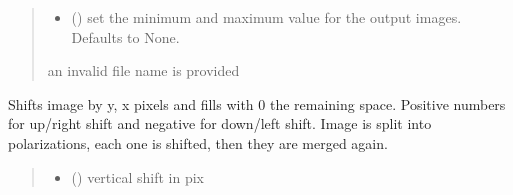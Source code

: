 \documentclass[letterpaper,10pt,english]{sphinxmanual}
\begin{document}
\begin{fulllineitems}
\begin{fulllineitems}
\begin{quote}
\begin{description}
\begin{itemize}
\item {} 
\sphinxAtStartPar
{} (\sphinxstyleliteralemphasis{\sphinxupquote{{[}}}\sphinxstyleliteralemphasis{\sphinxupquote{, }}\sphinxstyleliteralemphasis{\sphinxupquote{{]}}}\sphinxstyleliteralemphasis{\sphinxupquote{, }}) \textendash{} set the minimum and maximum value for the output images. Defaults to None.

\end{itemize}

\sphinxAtStartPar
{} \textendash{} an invalid file name is provided

\end{description}\end{quote}

\end{fulllineitems}


\begin{fulllineitems}
\label{\detokenize{micropolarray:micropolarray.micropol_image.MicropolImage.shift}}
\pysigstartsignatures
{}
\pysigstopsignatures
\sphinxAtStartPar
Shifts image by y, x pixels and fills with 0 the remaining space. Positive numbers for up/right shift and negative for down/left shift. Image is split into polarizations, each one is shifted, then they are merged again.
\begin{quote}\begin{description}
\begin{itemize}
\item {} 
\sphinxAtStartPar
{} () \textendash{} vertical shift in pix


\end{itemize}
\end{description}
\end{quote}
\end{fulllineitems}
\end{fulllineitems}
\end{document}
